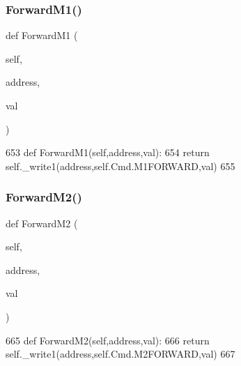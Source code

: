 \subsubsection{\texorpdfstring{Forward\+M1()}{ForwardM1()}}
{\footnotesize\ttfamily def Forward\+M1 (\begin{DoxyParamCaption}\item[{}]{self,  }\item[{}]{address,  }\item[{}]{val }\end{DoxyParamCaption})}


\begin{DoxyCode}
653     \textcolor{keyword}{def }ForwardM1(self,address,val):
654         \textcolor{keywordflow}{return} self.\_write1(address,self.Cmd.M1FORWARD,val)
655 
\end{DoxyCode}
\mbox{\label{classtoxic__hardware_1_1roboclaw__3_1_1Roboclaw_abce41d003f6c4583a79616837749db3f}} 
\subsubsection{\texorpdfstring{Forward\+M2()}{ForwardM2()}}
{\footnotesize\ttfamily def Forward\+M2 (\begin{DoxyParamCaption}\item[{}]{self,  }\item[{}]{address,  }\item[{}]{val }\end{DoxyParamCaption})}


\begin{DoxyCode}
665     \textcolor{keyword}{def }ForwardM2(self,address,val):
666         \textcolor{keywordflow}{return} self.\_write1(address,self.Cmd.M2FORWARD,val)
667 
\end{DoxyCode}
\mbox{\label{classtoxic__hardware_1_1roboclaw__3_1_1Roboclaw_acf82a90e2bcb68c83166a1be4978a556}} 

